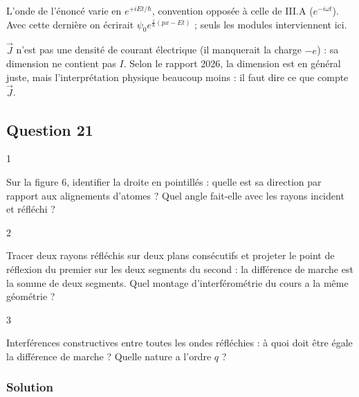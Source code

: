 \documentclass[11pt,a4paper]{article}
\begin{document}
L'onde de l'énoncé varie en \(e^{+iEt/\hbar}\), convention opposée à celle de III.A (\(e^{-i\omega t}\)). Avec cette dernière on écrirait \(\psi_0e^{\frac i\hbar(px-Et)}\) ; seuls les modules interviennent ici.

\begin{piege}

\(\vec J\) n'est pas une densité de courant électrique (il manquerait la charge \(-e\)) : sa dimension ne contient pas \(I\). Selon le rapport 2026, la dimension est en général juste, mais l'interprétation physique beaucoup moins : il faut dire ce que compte \(\vec J\).

\end{piege}

\hypertarget{question-21}{%
\subsection{Question 21}\label{question-21}}

\begin{indication}{1}

Sur la figure 6, identifier la droite en pointillés : quelle est sa direction par rapport aux alignements d'atomes ? Quel angle fait-elle avec les rayons incident et réfléchi ?

\end{indication}

\begin{indication}{2}

Tracer deux rayons réfléchis sur deux plans consécutifs et projeter le point de réflexion du premier sur les deux segments du second : la différence de marche est la somme de deux segments. Quel montage d'interférométrie du cours a la même géométrie ?

\end{indication}

\begin{indication}{3}

Interférences constructives entre toutes les ondes réfléchies : à quoi doit être égale la différence de marche ? Quelle nature a l'ordre \(q\) ?

\end{indication}

\hypertarget{solution-20}{%
\subsubsection{Solution}\label{solution-20}}
\end{document}
